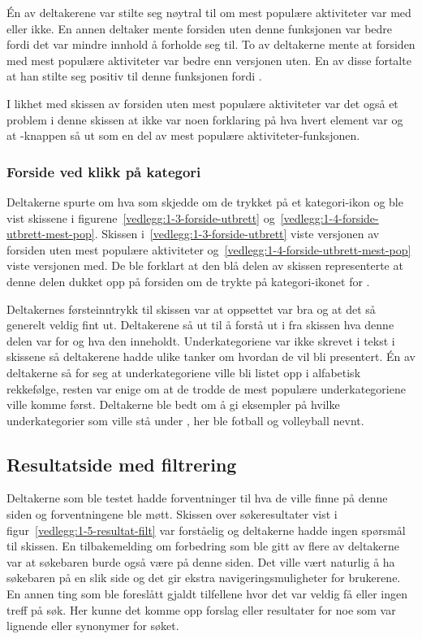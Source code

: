 Én av deltakerene var stilte seg nøytral til om mest populære aktiviteter var med eller ikke. En annen deltaker mente forsiden uten denne funksjonen var bedre fordi det var mindre innhold å forholde seg til. To av deltakerne mente at forsiden med mest populære aktiviteter var bedre enn versjonen uten. En av disse fortalte at han stilte seg positiv til denne funksjonen fordi .

I likhet med skissen av forsiden uten mest populære aktiviteter var det også et problem i denne skissen at ikke var noen forklaring på hva hvert element var og at -knappen så ut som en del av mest populære aktiviteter-funksjonen. 

\subsubsection{Forside ved klikk på kategori}
Deltakerne spurte om hva som skjedde om de trykket på et kategori-ikon og ble vist skissene i figurene~\ref{vedlegg:1-3-forside-utbrett} og~\ref{vedlegg:1-4-forside-utbrett-mest-pop}. Skissen i~\ref{vedlegg:1-3-forside-utbrett} viste versjonen av forsiden uten mest populære aktiviteter og~\ref{vedlegg:1-4-forside-utbrett-mest-pop} viste versjonen med. De ble forklart at den blå delen av skissen representerte at denne delen dukket opp på forsiden om de trykte på kategori-ikonet for .

Deltakernes førsteinntrykk til skissen var at oppsettet var bra og at det så generelt veldig fint ut. Deltakerene så ut til å forstå ut i fra skissen hva denne delen var for og hva den inneholdt. Underkategoriene var ikke skrevet i tekst i skissene så deltakerene hadde ulike tanker om hvordan de vil bli presentert. Én av deltakerne så for seg at underkategoriene ville bli listet opp i alfabetisk rekkefølge, resten var enige om at de trodde de mest populære underkategoriene ville komme først. Deltakerne ble bedt om å gi eksempler på hvilke underkategorier som ville stå under , her ble fotball og volleyball nevnt.

\subsection{Resultatside med filtrering}

Deltakerne som ble testet hadde forventninger til hva de ville finne på denne siden og forventningene ble møtt. 
Skissen over søkeresultater vist i figur~\ref{vedlegg:1-5-resultat-filt} var forståelig og deltakerne hadde ingen spørsmål til skissen.
En tilbakemelding om forbedring som ble gitt av flere av deltakerne var at søkebaren burde også være på denne siden. Det ville vært naturlig å ha søkebaren på en slik side og det gir ekstra navigeringsmuligheter for brukerene. En annen ting som ble foreslått gjaldt tilfellene hvor det var veldig få eller ingen treff på søk. Her kunne det komme opp forslag eller resultater for noe som var lignende eller synonymer for søket.


